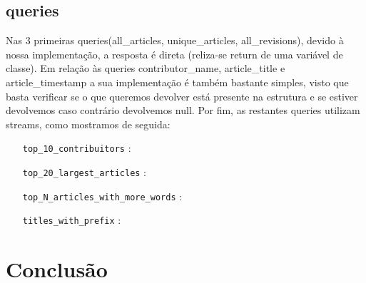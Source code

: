 \documentclass[a4paper,11pt]{article}
\begin{document}
\subsection{queries}
Nas 3 primeiras queries(all\_articles, unique\_articles, all\_revisions), devido à nossa implementação, a resposta é direta (reliza-se return de uma variável de classe). Em relação às queries contributor\_name, article\_title e article\_timestamp a sua implementação é também bastante simples, visto que basta verificar se o que queremos devolver está presente na estrutura e se estiver devolvemos caso contrário devolvemos null. Por fim, as restantes queries utilizam streams, como mostramos de seguida:
\begin{itemize}[align=left]
\item[\texttt{top\_10\_contribuitors}] :
\item[\texttt{top\_20\_largest\_articles}] :
\item[\texttt{top\_N\_articles\_with\_more\_words}] :
\item[\texttt{titles\_with\_prefix}] :
\end{itemize}

\newpage

\section{Conclusão}
\end{document}
